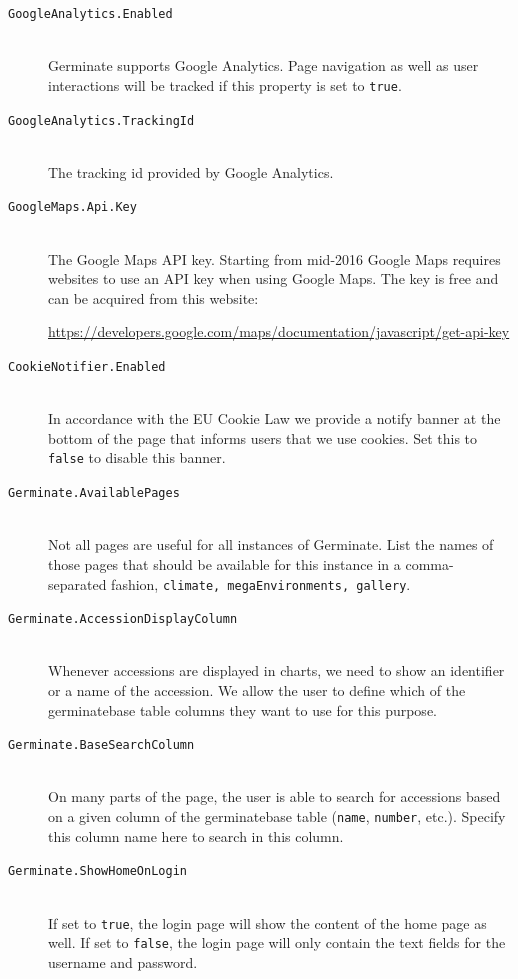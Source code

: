 \begin{description}
    \item[\texttt{GoogleAnalytics.Enabled}] \\Germinate supports Google Analytics. Page navigation as well as user interactions will be tracked if this property is set to \texttt{true}.
    \item[\texttt{GoogleAnalytics.TrackingId}\nonoptionalif] \floatright{[String]}\\ The tracking id provided by Google Analytics.
    \item[\texttt{GoogleMaps.Api.Key}\nonoptionalif] \floatright{[String]}\\ The Google Maps API key. Starting from mid-2016 Google Maps requires websites to use an API key when using Google Maps. The key is free and can be acquired from this website:
    \begin{center}
    	\url{https://developers.google.com/maps/documentation/javascript/get-api-key}
    \end{center}
    \noindent
    \item[\texttt{CookieNotifier.Enabled}] \\ In accordance with the EU Cookie Law \cite{CookieLaw} we provide a notify banner at the bottom of the page that informs users that we use cookies. Set this to \texttt{false} to disable this banner.
    \item[\texttt{Germinate.AvailablePages}\nonoptional] \floatright{[CSV]}\\Not all pages are useful for all instances of Germinate. List the names of those pages that should be available for this instance in a comma-separated fashion, \eg \texttt{climate, megaEnvironments, gallery}.
    \item[\texttt{Germinate.AccessionDisplayColumn}] \\Whenever accessions are displayed in charts, we need to show an identifier or a name of the accession. We allow the user to define which of the germinatebase table columns they want to use for this purpose.
    \item[\texttt{Germinate.BaseSearchColumn}] \\On many parts of the page, the user is able to search for accessions based on a given column of the germinatebase table (\eg \texttt{name}, \texttt{number}, etc.). Specify this column name here to search in this column.
    \item[\texttt{Germinate.ShowHomeOnLogin}] \\If set to \texttt{true}, the login page will show the content of the home page as well. If set to \texttt{false}, the login page will only contain the text fields for the username and password.

\end{description}
